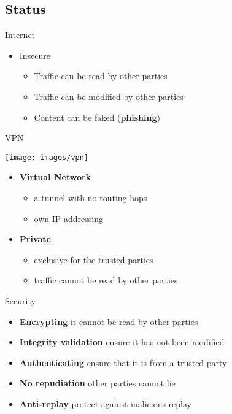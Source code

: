 \documentclass{beamer}
\begin{document}
\subsection*{Status}
\begin{frame}{Internet}
	\begin{itemize}
	\item Insecure
		\begin{itemize}
		\item Traffic can be read by other parties
		\item Traffic can be modified by other parties
		\item Content can be faked (\textbf{phishing})
		\end{itemize}
	\end{itemize}
\end{frame}
\begin{frame}{VPN}
	\begin{center}
	\texttt{[image: images/vpn]}
	\end{center}
	\begin{itemize}
	\item \textbf{Virtual Network}
		\begin{itemize}
		\item a tunnel with no routing hops
		\item own IP addressing
		\end{itemize}
	\item \textbf{Private}
		\begin{itemize}
		\item exclusive for the trusted parties
		\item traffic cannot be read by other parties
		\end{itemize}
	\end{itemize}
\end{frame}
\begin{frame}{Security}
	\begin{itemize}
	\item \textbf{Encrypting} it cannot be read by other parties
	\item \textbf{Integrity validation} ensure it has not been modified
	\item \textbf{Authenticating} ensure that it is from a trusted party
	\item \textbf{No repudiation} other parties cannot lie
	\item \textbf{Anti-replay} protect against malicious replay
	\end{itemize}
\end{frame}
\end{document}
